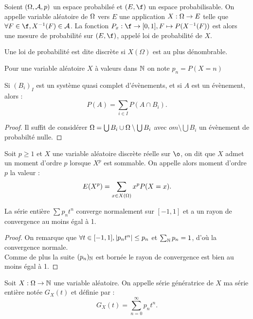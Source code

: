 \begin{defn}
Soient $(\Omega, \mathcal{A}, p)$ un espace probabilsé et $(E, \f)$ un espace probabilisable. 
On appelle variable aléatoire de $\Omega$ vers $E$ une application $X : \Omega \to E$ telle que $\forall F \in \f, X^{-1}(F) \in \a$.
La fonction $P_x : \f \to [0,1], F \mapsto P(X^{-1}(F))$ est alors une mesure de probabilité sur $(E, \f)$, appelé loi de probabilité de $X$.
\end{defn}

\begin{rmq}
Une loi de probabilité est dite discrète si $X(\Omega)$ est au plus dénombrable.
\end{rmq}

\begin{nota}
Pour une variable aléatoire $X$ à valeurs dans $\mathbb{N}$ on note $p_n = P(X=n)$
\end{nota}

\begin{lem}
Si $(B_i)_I$ est un système quasi complet d'évènements, et si $A$ est un évènement, alors :
\[ P(A) = \sum_{i \in I} P(A \cap B_i) . \] 
\end{lem}

\begin{proof}
Il suffit de considérer $\Omega = \bigcup B_i \cup \Omega \setminus \bigcup B_i$ avec $om \setminus \bigcup B_i$ un évènement de 
probabilté nulle.
\end{proof}

\begin{defn}[Moment]
Soit $p \geq 1$ et $X$ une variable aléatoire discrète réelle sur $\o$, on dit que $X$ admet un moment d'ordre $p$ lorsque
$X^p$ est sommable. On appelle alors moment d'ordre $p$ la valeur :
\[ E(X^p) = \sum_{x \in X(\Omega)} x^p P(X=x) . \]
\end{defn}

\begin{lem}
La série entière $\sum p_n t^n$ converge normalement sur $[-1,1]$ et a un rayon de convergence au moins égal à 1.
\end{lem}

\begin{proof}
On remarque que $\forall t \in [-1, 1], \lvert p_n t^n\rvert \leq p_n$ et $\sum_{\mathbb{N}} p_n = 1$, d'où la convergence normale. \\
Comme de plus la suite $(p_n)_{\mathbb{N}}$ est bornée le rayon de convergence est bien au moins égal à 1.
\end{proof}

\begin{defn}
Soit $X : \Omega \to \mathbb{N}$ une variable aléatoire. On appelle série génératrice de $X$ ma série entière notée $G_X(t)$ et définie par :
\[ G_X(t) = \sum_{n=0}^{\infty} p_n t^n . \]
\end{defn}

